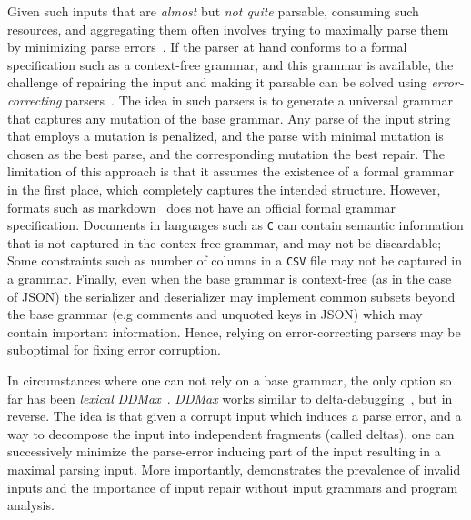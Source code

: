 \documentclass[sigconf,review,anonymous]{acmart}
\def\<#1>{\texttt{#1}}
\newcounter{todocounter}
\newcommand{\todo}[1]{\marginpar{$|$}\textcolor{red}{\stepcounter{todocounter}\footnote[\thetodocounter]{\textcolor{red}{\textbf{TODO }}\textit{#1}}}}
\newcommand{\recheck}[1]{\textcolor{red}{#1}}
\renewcommand{\todo}[1]{}
\newcommand{\ddmax}{\textit{DDMax}\xspace}
\begin{document}
Given such inputs that are \emph{almost} but \emph{not quite} parsable,
consuming such resources, and aggregating them often involves trying to
maximally parse them by minimizing parse errors~\cite{kirschner2020debugging}.
If the parser at hand conforms to a formal specification such as a context-free
grammar, and this grammar is available,
the challenge of repairing the input and making it parsable can be solved using
\emph{error-correcting} parsers~\cite{aho1972minimum,diekmann2020dont,parr2011ll}.
The idea in such parsers is to generate a universal grammar that captures
any mutation of the base grammar. Any parse of the input string that employs a
mutation is penalized, and the parse with minimal mutation is chosen as the
best parse, and the corresponding mutation the best repair. The limitation of
this approach is that it assumes the existence of a formal grammar in the first
place, which completely captures the intended structure. 
However, formats such as markdown~\cite{gruber2004markdown} does not have
an official formal grammar specification.
Documents in languages such as \<C> can contain semantic
information that is not captured in the contex-free grammar, and may not be
discardable; Some constraints such as number of columns in a \<CSV> file may
not be captured in a grammar. Finally, even when the base grammar is context-free
(as in the case of JSON) the serializer and deserializer may implement common
subsets beyond the base grammar (e.g comments and unquoted keys in JSON) which may
contain important information. Hence, relying on error-correcting parsers may
be suboptimal for fixing error corruption.

In circumstances where one can not rely on a base grammar, the only option so far
has been \textit{lexical} \ddmax~\cite{kirschner2020debugging}. \ddmax works similar to
delta-debugging~\cite{zeller2002simplifying}, but in reverse. The idea
is that given a corrupt input which induces a parse error, and a way to
decompose the input into independent fragments (called deltas), one can
successively minimize the parse-error inducing part of the input resulting in a
maximal parsing input. 
More importantly, \citet{kirschner2020debugging} demonstrates the prevalence of invalid inputs and the importance of input repair without input grammars and program analysis.
\end{document}
